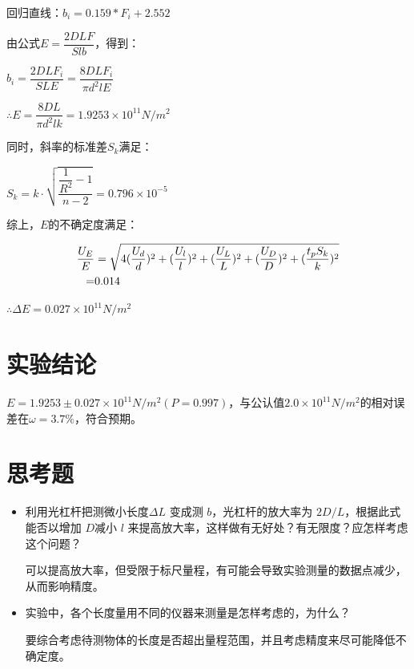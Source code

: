 \documentclass[a4paper]{ltxdoc}
\begin{document}
\begin{multicols}{2}
    回归直线：$b_i =0.159 * F_i + 2.552$

    由公式$E=\dfrac{2DLF}{Slb}$，得到：

    \smallskip

    $b_i = \dfrac{2DLF_i}{SLE} = \dfrac{8DLF_i}{\pi d^2 lE}$

    \smallskip

    $\therefore E = \dfrac{8DL}{\pi d^2 l k} = 1.9253 \times 10^{11} N / m^2 $

    \smallskip

    同时，斜率的标准差$S_k$满足：

    \smallskip

    $S_k = k\cdot \sqrt{\dfrac{\dfrac {1} {R^2} -1}{n-2}} = 0.796 \times 10^{-5}$

    \smallskip

    综上，$E$的不确定度满足：

    \begin{equation}
        \begin{aligned}
            \dfrac{U_E} {E} & = \sqrt{4(\dfrac{U_d}{d})^2 + (\dfrac{U_l}{l})^2 + (\dfrac{U_L}{L})^2 + (\dfrac{U_D}{D})^2 + (\dfrac {t_p S_k} {k})^2} \\
            =               & 0.014                                                                                                                  \\
        \end{aligned}
        \notag
    \end{equation}

    $\therefore \Delta E = 0.027 \times 10 ^{11} N / m^2$

    \section{实验结论}

    $E = 1.9253 \pm 0.027 \times 10^{11} N /m^2 (P =0.997)$，与公认值$2.0\times 10^11 N/m^2$的相对误差在$\omega = 3.7\%$，符合预期。

    \section{思考题}

    \begin{itemize}
        \item 利用光杠杆把测微小长度$\Delta L$ 变成测 $b$，光杠杆的放大率为 $2D/L$，根据此式能否以增加 $D$减小 $l$ 来提高放大率，这样做有无好处？有无限度？应怎样考虑这个问题？

              可以提高放大率，但受限于标尺量程，有可能会导致实验测量的数据点减少，从而影响精度。
        \item 实验中，各个长度量用不同的仪器来测量是怎样考虑的，为什么？

              要综合考虑待测物体的长度是否超出量程范围，并且考虑精度来尽可能降低不确定度。
    \end{itemize}
\end{multicols}
\end{document}
